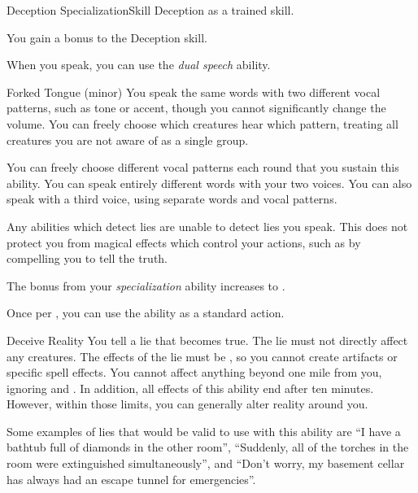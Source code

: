     \begin{feat}{Deception Specialization}{Skill}
        \featpre Deception as a trained skill.

         You gain a  bonus to the Deception skill.

         When you speak, you can use the \textit{dual speech} ability.
        \begin{sustainability}{Forked Tongue}{ (minor)}
            \rankline
            You speak the same words with two different vocal patterns, such as tone or accent, though you cannot significantly change the volume.
            You can freely choose which creatures hear which pattern, treating all creatures you are not aware of as a single group. 

            You can freely choose different vocal patterns each round that you sustain this ability.
            \rankline
             You can speak entirely different words with your two voices.
             You can also speak with a third voice, using separate words and vocal patterns.
        \end{sustainability}

         Any \magical abilities which detect lies are unable to detect lies you speak.
        This does not protect you from magical effects which control your actions, such as by compelling you to tell the truth.

         The bonus from your \textit{specialization} ability increases to .

         Once per , you can use the  ability as a standard action.
        \begin{magicalactiveability}{Deceive Reality}
            \rankline
            You tell a lie that becomes true.
            The lie must not directly affect any creatures.
            The effects of the lie must be , so you cannot create artifacts or specific spell effects.
            You cannot affect anything beyond one mile from you, ignoring  and .
            In addition, all effects of this ability end after ten minutes.
            However, within those limits, you can generally alter reality around you.

            Some examples of lies that would be valid to use with this ability are ``I have a bathtub full of diamonds in the other room'', ``Suddenly, all of the torches in the room were extinguished simultaneously'', and ``Don't worry, my basement cellar has always had an escape tunnel for emergencies''.
        \end{magicalactiveability}
    \end{feat}

